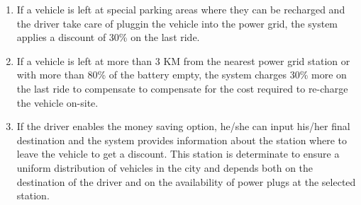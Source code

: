 \begin{enumerate}
	\item If a vehicle is left at special parking areas where they can be recharged and the driver take care of pluggin the vehicle into the power grid, the system applies a discount of 30\% on the last ride.
	\item If a vehicle is left at more than 3 KM from the nearest power grid station or with more than 80\% of the battery empty, the system charges 30\% more on the last ride to compensate to compensate for the cost required to re-charge the vehicle on-site.
	\item If the driver enables the money saving option, he/she can input his/her final destination and the system provides information about the station where to leave the vehicle to get a discount. This station is determinate to ensure a uniform distribution of vehicles in the city and depends both on the destination of the driver and on the availability of power plugs at the selected station.
\end{enumerate}